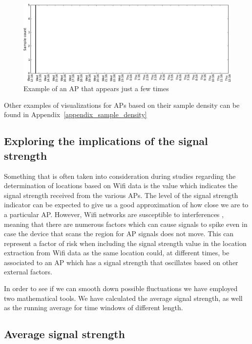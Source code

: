 \begin{figure}[h]
\centering
\includegraphics[width
=\textwidth, height =
0.4\textwidth]{figures/combinations/1553_modif.png}
\caption{Example of an AP that appears just a few times}
\label{few_samples_6_2nd_day}
\end{figure}

Other examples of visualizations for APs based on their sample density can be
found in Appendix~\ref{appendix_sample_density}

\subsection{Exploring the implications of the signal strength}

Something that is often taken into consideration during studies regarding the
determination of locations based on Wifi data is the value which indicates the
signal strength received from the various APs. The level of the signal strength
indicator can be expected to give us a good approximation of how close we are to
a particular AP. However, Wifi networks are susceptible to interferences
\cite{MahantiCWA10}, meaning that there are numerous factors which can cause
signals to spike even in case the device that scans the region for AP signals
does not move. This can represent a factor of risk when including the signal
strength value in the location extraction from Wifi data as the same location
could, at different times, be associated to an AP which has a signal strength
that oscillates based on other external factors.

In order to see if we can smooth down possible fluctuations we have employed two
mathematical tools. We have calculated the average signal strength, as well as
the running average for time windows of different length.

\subsection{Average signal strength}
\label{average_sig}

